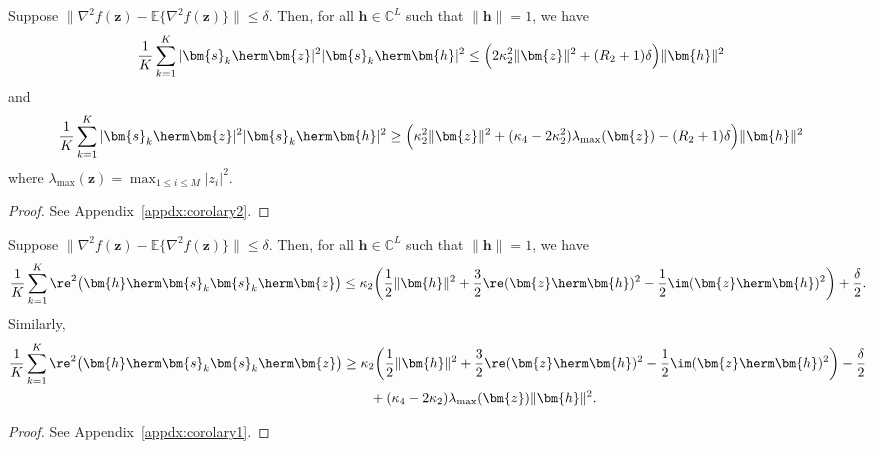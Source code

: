 \begin{cor} \label{cor:2} 
	Suppose $\|\nabla^2f(\bm{z})-\mathbb{E}\{\nabla^2f(\bm{z})\}\|\leq\delta$. Then, for all $\bm{h}\in\mathbb{C}^L$ such that $\|\bm{h}\|=1$, we have
	\begin{align}
	&\frac{1}{K}\sum_{k=1}^K|\bm{s}_k\herm\bm{z}|^2|\bm{s}_k\herm\bm{h}|^2\leq  \Big(2\kappa_2^2\|\bm{z}\|^2+(R_2+1)\delta\Big)\|\bm{h}\|^2 \label{eqn:A_upperBound}
	\end{align}
	and 
	\begin{align}
	&\frac{1}{K}\sum_{k=1}^K|\bm{s}_k\herm\bm{z}|^2|\bm{s}_k\herm\bm{h}|^2\geq\Big(\kappa_2^2\|\bm{z}\|^2+ (\kappa_4-2\kappa_2^2)\lambda_{\mathrm{max}}(\bm{z})-(R_2+1)\delta\Big)\|\bm{h}\|^2 \label{eqn:A_lowerBound}
	\end{align}
	where $\lambda_{\mathrm{max}}(\bm{z})=\max_{1\leq i\leq M}|z_i|^2$.	
\end{cor}
\begin{proof}
	See Appendix~\ref{appdx:corolary2}.
\end{proof}

\begin{cor} \label{cor:1} 
	Suppose $\|\nabla^2f(\bm{z})-\mathbb{E}\{\nabla^2f(\bm{z})\}\|\leq\delta$. Then, for all $\bm{h}\in\mathbb{C}^L$ such that $\|\bm{h}\|=1$, we have
	\begin{align}
	\frac{1}{K}\sum_{k=1}^K\re^2\big(\bm{h}\herm\bm{s}_k\bm{s}_k\herm\bm{z}\big)\leq\kappa_2\bigg(\frac{1}{2}\|\bm{h}\|^2+\frac{3}{2}\re(\bm{z}\herm\bm{h})^2-\frac{1}{2}\im(\bm{z}\herm\bm{h})^2\bigg)+\frac{\delta}{2}. \label{eqn:hessian_upperBound}
	\end{align}
	Similarly, 
	\begin{align}
	\frac{1}{K}\sum_{k=1}^K\re^2\big(\bm{h}\herm\bm{s}_k\bm{s}_k\herm\bm{z}\big)&\geq\kappa_2\bigg(\frac{1}{2}\|\bm{h}\|^2+\frac{3}{2}\re(\bm{z}\herm\bm{h})^2-\frac{1}{2}\im(\bm{z}\herm\bm{h})^2\bigg)-\frac{\delta}{2}\nonumber\\
	&\quad\quad+(\kappa_4-2\kappa_2)\lambda_{\mathrm{max}}(\bm{z})\|\bm{h}\|^2. \label{eqn:hessian_lowerBound}
	\end{align}
\end{cor}
\begin{proof}
	See Appendix~\ref{appdx:corolary1}.
\end{proof}

